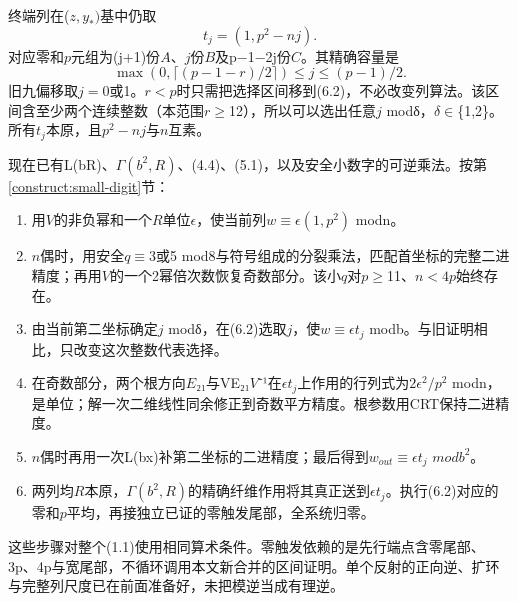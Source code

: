 \documentclass[11pt,a4paper]{article}
\newcommand{\tightlist}{\setlength{\itemsep}{0pt}\setlength{\parskip}{0pt}}
\theoremstyle{definition}
\numberwithin{equation}{section}
\begin{document}
{终端列在(\ensuremath{z,y_*)}基中仍取} \[
t_j=(1,p^2-nj).
\tag{C18.6.1}
\] {对应零和\ensuremath{p}元组为(j+1)份\ensuremath{A}、\ensuremath{j}份\ensuremath{B}及p−1−2j份\ensuremath{C}。其精确容量是} \[
\boxed{\max(0,\lceil(p-1-r)/2\rceil)\le j\le(p-1)/2.}
\tag{C18.6.2}
\] {旧九偏移取\ensuremath{j=0}或1。\ensuremath{r<p}时只需把选择区间移到(6.2)，不必改变列算法。该区间含至少两个连续整数（本范围\ensuremath{r}\ensuremath{\ge}12），所以可以选出任意\ensuremath{j}} {modδ，\ensuremath{\delta }\ensuremath{\in}\{1,2\}。所有\ensuremath{t_{j}}本原，且\ensuremath{p^{2}-nj}与\ensuremath{n}互素。}

{现在已有L(bR)、\ensuremath{\Gamma (b^{2},R)}、(4.4)、(5.1)，以及安全小数字的可逆乘法。按}第\ref{construct:small-digit}节{：}

\begin{enumerate}
\def\labelenumi{\arabic{enumi}.}
\tightlist
\item
  {用\ensuremath{V}的非负幂和一个\ensuremath{R}单位\ensuremath{\epsilon }，使当前列\ensuremath{w}\ensuremath{\equiv}\ensuremath{\epsilon (1,p^{2})}} {modn。}
\item
  {\ensuremath{n}偶时，用安全\ensuremath{q}\ensuremath{\equiv}3或5} {mod8与符号组成的分裂乘法，匹配首坐标的完整二进精度；再用\ensuremath{V}的一个2幂倍次数恢复奇数部分。该小\ensuremath{q}对\ensuremath{p}\ensuremath{\ge}11、\ensuremath{n<4p}始终存在。}
\item
  {由当前第二坐标确定\ensuremath{j}} {modδ，在(6.2)选取\ensuremath{j}，使\ensuremath{w}\ensuremath{\equiv}\ensuremath{\epsilon t_{j}}} {modb。与旧证明相比，只改变这次整数代表选择。}
\item
  {在奇数部分，两个根方向\ensuremath{E}₂₁与VE₂₁\ensuremath{V}⁻¹在\ensuremath{\epsilon t_{j}}上作用的行列式为\ensuremath{2\epsilon ^{2}/p^{2}}} {modn，是单位；解一次二维线性同余修正到奇数平方精度。根参数用CRT保持二进精度。}
\item
  {\ensuremath{n}偶时再用一次L(bx)补第二坐标的二进精度；最后得到\ensuremath{w_{out}}\ensuremath{\equiv}\ensuremath{\epsilon t_{j}}} {\ensuremath{modb^{2}}。}
\item
  {两列均\ensuremath{R}本原，\ensuremath{\Gamma (b^{2},R)}的精确纤维作用将其真正送到\ensuremath{\epsilon t_{j}}。执行(6.2)对应的零和\ensuremath{p}平均，再接独立已证的零触发尾部，全系统归零。}
\end{enumerate}

{这些步骤对整个(1.1)使用相同算术条件。零触发依赖的是先行端点含零尾部、3p、4p与宽尾部，不循环调用本文新合并的区间证明。单个反射的正向逆、扩环与完整列尺度已在前面准备好，未把模逆当成有理逆。}
\end{document}
